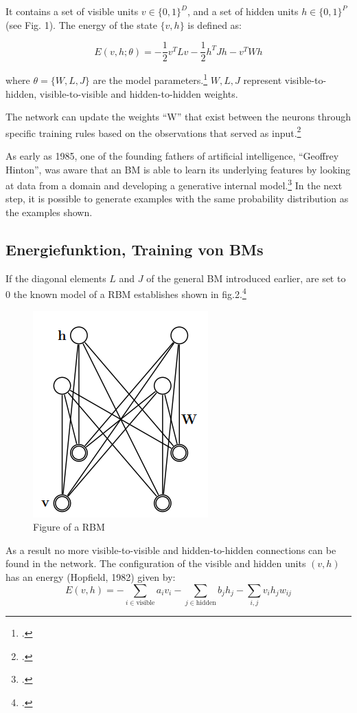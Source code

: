 It contains a set of visible units \( v \in \{0, 1\}^D \), and a set of hidden units \( h \in \{0, 1\}^P \) (see Fig. 1). The energy of the state \( \{v, h\} \) is defined as:

\begin{equation}
E(v, h; \theta) = -\frac{1}{2} v^T L v - \frac{1}{2} h^T J h - v^T W h
\end{equation}

where \( \theta = \{W, L, J\} \) are the model parameters.\footcite[448][Vgl.]{salakhutdinovDeepBoltzmannMachines2009}
\( W, L, J \) represent visible-to-hidden, visible-to-visible and hidden-to-hidden weights.
 

The network can update the weights ``W'' that exist between the neurons through specific training rules based on the observations that served as input.\footcite[Vgl.][1-2]{barraEquivalenceHopfieldNetworks2012}

As early as 1985, one of the founding fathers of artificial intelligence, ``Geoffrey Hinton'', was aware that an \ac{BM} is able to learn its underlying features by looking at data from a domain and developing a generative internal model.\footcite[Vgl.][148]{ackleyLearningAlgorithmBoltzmann1985}
In the next step, it is possible to generate examples with the same probability distribution as the examples shown.


\subsection{Energiefunktion, Training von BMs}


If the diagonal elements \( L \) and \( J \) of the general \ac{BM} introduced earlier, are set to 0 the known model of a \ac{RBM} establishes shown in fig.2.\footcite[Vgl.][449]{salakhutdinovDeepBoltzmannMachines2009}

\begin{figure}[H]
    \centering
    \includegraphics[width=0.25\linewidth]{graphics/RBM_Modell.png}
    \caption{Figure of a \ac{RBM}}
\end{figure}
As a result no more visible-to-visible and hidden-to-hidden connections can be found in the network.
The configuration of the visible and hidden units \( (v, h) \) has an energy (Hopfield, 1982) given by:
\begin{equation}
E(v, h) = - \sum_{i \in \text{visible}} a_i v_i - \sum_{j \in \text{hidden}} b_j h_j - \sum_{i,j} v_i h_j w_{ij}
\end{equation}


